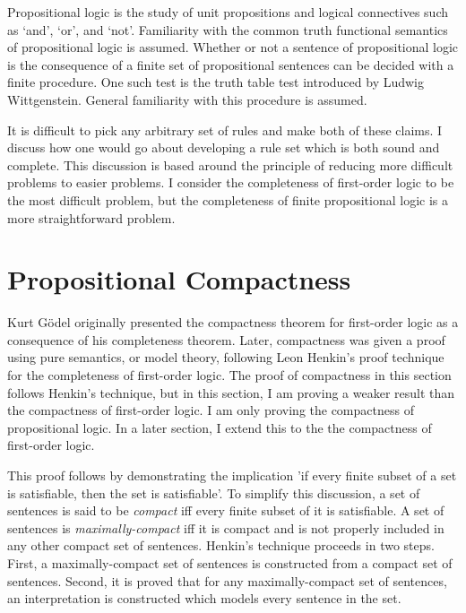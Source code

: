 \documentclass[12pt]{article}
\theoremstyle{definition}
\theoremstyle{remark}
\begin{document}
Propositional logic is the study of unit propositions and logical connectives such as `and', `or', and `not'. Familiarity with the common truth functional semantics of propositional logic is assumed. Whether or not a sentence of propositional logic is the consequence of a finite set of propositional sentences can be decided with a finite procedure. One such test is the truth table test introduced by Ludwig Wittgenstein\cite{tractatus}. General familiarity with this procedure is assumed. 

It is difficult to pick any arbitrary set of rules and make both of these claims. I discuss how one would go about developing a rule set which is both sound and complete. This discussion is based around the principle of reducing more difficult problems to easier problems. I consider the completeness of first-order logic to be the most difficult problem, but the completeness of finite propositional logic is a more straightforward problem.

\section{Propositional Compactness}

Kurt G{\"o}del\cite{godelcompleteness} originally presented the compactness theorem for first-order logic as a consequence of his completeness theorem. Later, compactness was given a proof using pure semantics, or model theory, following Leon Henkin's proof technique for the completeness of first-order logic. The proof of compactness in this section follows Henkin's technique, but in this section, I am proving a weaker result than the compactness of first-order logic. I am only proving the compactness of propositional logic. In a later section, I extend this to the the compactness of first-order logic. 

This proof follows by demonstrating the implication 'if every finite subset of a set is satisfiable, then the set is satisfiable'. To simplify this discussion, a set of sentences is said to be \textit{compact} iff every finite subset of it is satisfiable. A set of sentences is \textit{maximally-compact} iff it is compact and is not properly included in any other compact set of sentences. Henkin's technique proceeds in two steps. First, a maximally-compact set of sentences is constructed from a compact set of sentences. Second, it is proved that for any maximally-compact set of sentences, an interpretation is constructed which models every sentence in the set.
\end{document}
